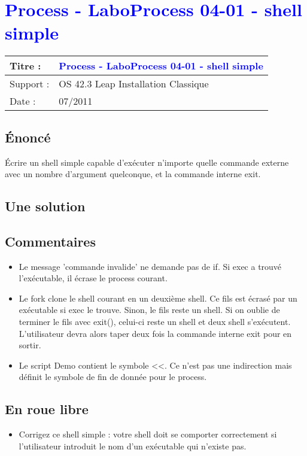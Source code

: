 \lstset{language=c}
\renewcommand{\titre}{\textcolor{blue}{ Process - LaboProcess 04-01 - shell simple }}

\lhead{ \titre }
\section{{\titre} }

\begin{tabular}{|l|l|}
\hline
Titre : 	& \titre \\\hline
Support : 	& OS 42.3 Leap Installation Classique \\\hline
Date :		& 07/2011 \\\hline
\end{tabular}

\subsection{Énoncé}

Écrire un shell simple capable d'exécuter n'importe quelle commande externe avec un nombre d'argument quelconque, et la commande interne exit. 

\subsection{Une solution}



\subsection{Commentaires}

\begin{itemize}
\item Le message 'commande invalide' ne demande pas de if. Si exec a trouvé l'exécutable, il écrase le process courant.
\item Le fork clone le shell courant en un deuxième shell. Ce fils est écrasé par un exécutable si exec le trouve. Sinon, le fils reste un shell. Si on oublie de terminer le fils avec exit(), celui-ci reste un shell et deux shell s'exécutent. L'utilisateur devra alors taper deux fois la commande interne exit pour en sortir.
\item Le script Demo contient le symbole <<. Ce n'est pas une indirection mais définit le symbole de fin de donnée pour le process.
\end{itemize}
\subsection{En roue libre}
\begin{itemize}
\item Corrigez ce shell simple : votre shell doit se comporter correctement si l'utilisateur introduit le nom d'un exécutable qui n'existe pas.
\end{itemize}
\newpage
